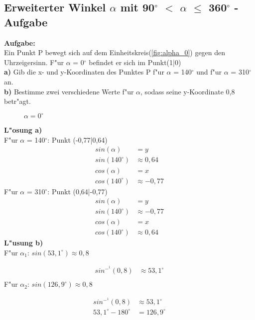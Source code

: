 \documentclass{standalone}
\begin{document}
\subsection{Erweiterter Winkel $\alpha$ mit 90$^\circ$  $<$ $\alpha$ $\leq$ 360$^\circ$  - Aufgabe}

\noindent\textbf{Aufgabe:}\\
Ein Punkt P bewegt sich auf dem Einheitskreis(\autoref{fig:alpha_0}) gegen den Uhrzeigersinn. F{"u}r $\alpha$ = 0$^\circ$  befindet er sich im Punkt(1|0)\\
\textbf{a)} Gib die x- und y-Koordinaten des Punktes P f{"u}r $\alpha$ = 140$^\circ$  und f{"u}r $\alpha$ = 310$^\circ$  an.\\
\textbf{b)} Bestimme zwei verschiedene Werte f{"u}r $\alpha$, sodass seine y-Koordinate 0,8 betr{"a}gt.\\

\begin{figure}[hb!]
  \centering
  \def\svgwidth{150px}
  
  \caption{$\alpha = 0^\circ $}
  \label{fig:alpha_0}
\end{figure}

\noindent\textbf{L{"o}sung a)}\\
\noindent F{"u}r $\alpha$ = 140$^\circ$: Punkt (-0,77|0,64)
\begin{align}
  sin(\alpha)     & = y \tag{1}           \\
  sin(140^\circ ) & \approx 0,64 \tag{2}  \\
  cos(\alpha)     & = x \tag{3}           \\
  cos(140^\circ ) & \approx -0,77 \tag{4}
\end{align}
\noindent F{"u}r $\alpha$ = 310$^\circ$: Punkt (0,64|-0,77)
\begin{align}
  sin(\alpha)     & = y \tag{1}           \\
  sin(140^\circ ) & \approx -0,77 \tag{2} \\
  cos(\alpha)     & = x \tag{3}           \\
  cos(140^\circ ) & \approx 0,64 \tag{4}
\end{align}
\noindent\textbf{L{"u}sung b)}\\
\noindent F{"u}r $\alpha_1$: $sin(53,1^\circ) \approx 0,8$

\begin{align}
  sin^-^1(0,8) & \approx 53,1^\circ \tag{1} \\
\end{align}
\noindent F{"u}r $\alpha_2$: $sin(126,9^\circ) \approx 0,8$

\begin{align}
  sin^-^1(0,8)           & \approx 53,1^\circ \tag{1} \\
  53,1^\circ - 180^\circ & = 126,9^\circ \tag{2}
\end{align}\\
\end{document}
